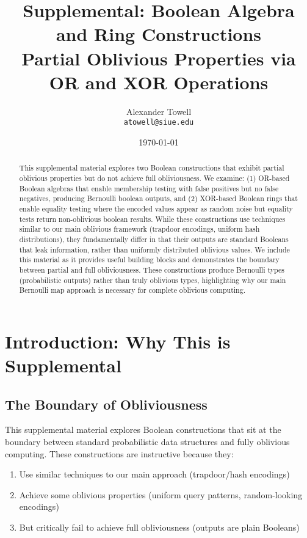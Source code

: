 \documentclass[11pt,final,hidelinks]{article}
\title{Supplemental: Boolean Algebra and Ring Constructions\\\small{Partial Oblivious Properties via OR and XOR Operations}}
\author{
    Alexander Towell\\
    \texttt{atowell@siue.edu}
}
\date{\today}
\begin{document}
\maketitle

\begin{abstract}
This supplemental material explores two Boolean constructions that exhibit partial oblivious properties but do not achieve full obliviousness. We examine: (1) OR-based Boolean algebras that enable membership testing with false positives but no false negatives, producing Bernoulli boolean outputs, and (2) XOR-based Boolean rings that enable equality testing where the encoded values appear as random noise but equality tests return non-oblivious boolean results. While these constructions use techniques similar to our main oblivious framework (trapdoor encodings, uniform hash distributions), they fundamentally differ in that their outputs are standard Booleans that leak information, rather than uniformly distributed oblivious values. We include this material as it provides useful building blocks and demonstrates the boundary between partial and full obliviousness. These constructions produce Bernoulli types (probabilistic outputs) rather than truly oblivious types, highlighting why our main Bernoulli map approach is necessary for complete oblivious computing.
\end{abstract}

\ObliviousNotationGuide

\section{Introduction: Why This is Supplemental}

\subsection{The Boundary of Obliviousness}

This supplemental material explores Boolean constructions that sit at the boundary between standard probabilistic data structures and fully oblivious computing. These constructions are instructive because they:

\begin{enumerate}
    \item Use similar techniques to our main approach (trapdoor/hash encodings)
    \item Achieve some oblivious properties (uniform query patterns, random-looking encodings)
    \item But critically fail to achieve full obliviousness (outputs are plain Booleans)
\end{enumerate}
\end{document}
